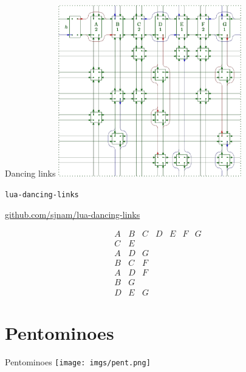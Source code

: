 \documentclass[xcolor=svgnames]{beamer}
\begin{document}
%
\begin{frame}{Dancing links}
  \centering\includegraphics[height=7.5cm]{imgs/cdance-4.png}
\end{frame}

%
\begin{frame}{\texttt{lua-dancing-links}}
\begin{center}
  \href{https://github.com/sjnam/lua-dancing-links}
       {github.com/sjnam/lua-dancing-links}
\end{center}
$$
  \begin{array}{ccccccc}
    A & B & C & D & E & F & G\\
    C & E &&&&&\\
    A & D & G &&&&\\
    B & C & F &&&&\\
    A & D & F &&&&\\
    B & G &&&&&\\
    D & E & G &&&&
  \end{array}
$$
\end{frame}


\section{Pentominoes}

%
\begin{frame}[fragile]{Pentominoes}
  \centering\texttt{[image: imgs/pent.png]}
\end{frame}
\end{document}
